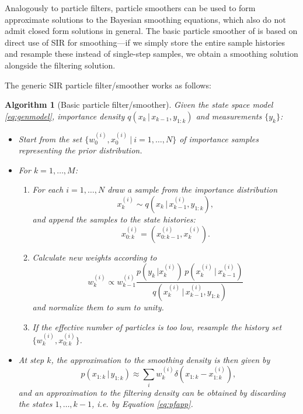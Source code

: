 \documentclass[twocolumn]{autart}    %
\newtheorem{algo}{Algorithm}[section]
\begin{document}
Analogously to particle filters, particle smoothers can be used to
form approximate solutions to the Bayesian smoothing equations,
which also do not admit closed form solutions in general. The basic particle
smoother of \cite{Kitagawa:1996} is based on direct use of SIR for
smoothing---if we simply store the entire sample histories and resample these
instead of single-step samples, we obtain a smoothing solution
alongside the filtering solution.

The generic SIR particle filter/smoother \cite{Kitagawa:1996} works as
follows:
%
\begin{algo}[Basic particle filter/smoother]
  Given the state space model \eqref{eq:genmodel}, importance
  density $q(x_{k} \, | \, x_{k-1},y_{1:k})$ and measurements $\{ y_k
  \}$:
\begin{itemize}
\item Start from the set $\{ w^{(i)}_0,x_0^{(i)} ~|~
  i=1,\ldots,N \}$ of importance samples representing the
  prior distribution.
\item For $k = 1,\ldots,M$:
\begin{enumerate}
\item For each $i=1,\ldots,N$ draw a sample from the importance
  distribution
  \begin{equation}
     x_k^{(i)} \sim q(x_{k} \, | \, x_{k-1}^{(i)},y_{1:k}),
  \end{equation}
%
  and append the samples to the state histories:
%
  \begin{equation}
     x_{0:k}^{(i)} = (x_{0:k-1}^{(i)},x_k^{(i)}).
  \end{equation}
%
\item Calculate new weights according to
  \begin{equation}
    w_k^{(i)} \propto
    w_{k-1}^{(i)} \frac{p(y_k \, | x_k^{(i)}) \, p(x_k^{(i)}\,|\,x_{k-1}^{(i)})}
                       {q(x_{k}^{(i)} \, | \, x_{k-1}^{(i)},y_{1:k})}
  \end{equation}
%
  and normalize them to sum to unity.

\item If the effective number of particles is too low, resample the
  history set $\{ w_k^{(i)}, x_{0:k}^{(i)} \}$.
\end{enumerate}

\item At step $k$, the approximation to the smoothing density is
  then given by
  \begin{equation}
     p(x_{1:k}\,|\,y_{1:k})
     \approx \sum_i w_k^{(i)} \delta(x_{1:k} - x_{1:k}^{(i)}),
  \end{equation}
  and an approximation to the filtering density can be obtained by
  discarding the states $1,\ldots,k-1$, i.e. by Equation \eqref{eq:pfapp}.
\end{itemize}
\end{algo}
\end{document}
